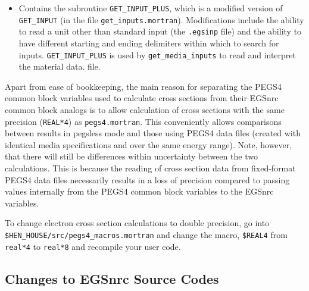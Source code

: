 \begin{description}
\begin{itemize}
echoed.  The subroutine also has an entry point, {\tt show\_media\_parameters(ounit)}, which can be called from
the user code to echo the media specifications to any unit at any point after they have been read in.  Finally,
this subroutine opens up and writes to the {\tt .mederr} file, containing information about the source of
media specifications used ({\it i.e.} the material data file or the {\tt .egsinp} file).
\item Contains the subroutine {\tt GET\_INPUT\_PLUS}, which is a modified version of {\tt GET\_INPUT} (in the
file {\tt get\_inputs.mortran}).  Modifications include the ability to read a unit other than standard input
(the {\tt .egsinp} file) and the ability to have different starting and ending delimiters within which to search
for inputs.  {\tt GET\_INPUT\_PLUS} is used by {\tt get\_media\_inputs} to read and interpret the material data.
file.
\end{itemize}
\end{description}

Apart from ease of bookkeeping, the main reason for separating the PEGS4 common block variables used to
calculate cross sections from their EGSnrc common block analogs is to allow calculation of cross sections
with the same precision ({\tt REAL*4}) as {\tt pegs4.mortran}.  This conveniently allows comparisons between
results in pegsless mode and those using PEGS4 data files (created with identical media specifications and over
the same energy range).  Note, however, that there will still be differences within uncertainty between the two calculations.
This is because the reading of cross section data from fixed-format PEGS4 data files necessarily results in a
loss of precision compared to passing values internally from the PEGS4 common block variables to the EGSnrc
variables.

To change electron cross section calculations to double precision, go into \\
{\tt \$HEN\_HOUSE/src/pegs4\_macros.mortran}
and change the macro, {\tt \$REAL4} from {\tt real*4} to {\tt real*8} and recompile your user code.

\subsection{Changes to EGSnrc Source Codes}

